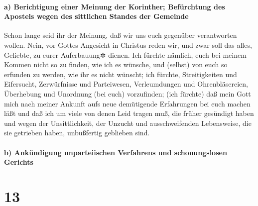\hypertarget{a-berichtigung-einer-meinung-der-korinther-befuxfcrchtung-des-apostels-wegen-des-sittlichen-standes-der-gemeinde}{%
\paragraph{a) Berichtigung einer Meinung der Korinther; Befürchtung des
Apostels wegen des sittlichen Standes der
Gemeinde}\label{a-berichtigung-einer-meinung-der-korinther-befuxfcrchtung-des-apostels-wegen-des-sittlichen-standes-der-gemeinde}}

 Schon lange seid ihr der Meinung, daß wir uns euch
gegenüber verantworten wollen. Nein, vor Gottes Angesicht in Christus
reden wir, und zwar soll das alles, Geliebte, zu eurer Auferbauung✲
dienen.  Ich fürchte nämlich, euch bei meinem Kommen
nicht so zu finden, wie ich es wünsche, und (selbst) von euch so
erfunden zu werden, wie ihr es nicht wünscht; ich fürchte,
Streitigkeiten und Eifersucht, Zerwürfnisse und Parteiwesen,
Verleumdungen und Ohrenbläsereien, Überhebung und Unordnung (bei euch)
vorzufinden;  (ich fürchte) daß mein Gott mich nach
meiner Ankunft aufs neue demütigende Erfahrungen bei euch machen läßt
und daß ich um viele von denen Leid tragen muß, die früher gesündigt
haben und wegen der Unsittlichkeit, der Unzucht und ausschweifenden
Lebensweise, die sie getrieben haben, unbußfertig geblieben sind.

\hypertarget{b-ankuxfcndigung-unparteiischen-verfahrens-und-schonungslosen-gerichts}{%
\paragraph{b) Ankündigung unparteiischen Verfahrens und schonungslosen
Gerichts}\label{b-ankuxfcndigung-unparteiischen-verfahrens-und-schonungslosen-gerichts}}

\hypertarget{section-12}{%
\section{13}\label{section-12}}

